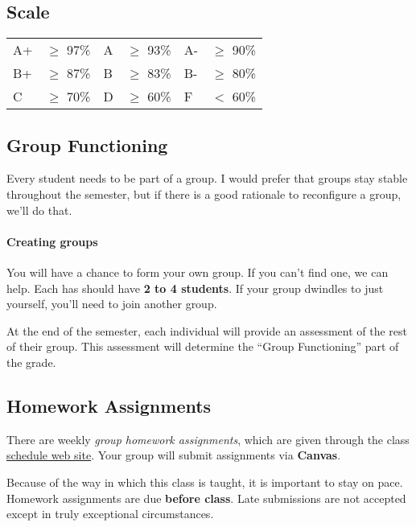 \documentclass[11pt]{article}
\begin{document}
\subsection{Scale}\label{scale}

\begin{tabular}{llllll}
A+ & $\ge$ 97\% & A & $\ge$  93\% & A- & $\ge$
90\% \\
B+ & $\ge$  87\% & B & $\ge$  83\% & B- & $\ge$
80\% \\
C & $\ge$  70\% & D & $\ge$  60\% & F & $<$
60\% \\
\end{tabular}

\subsection{Group Functioning}\label{group-functioning}

Every student needs to be part of a group. I would prefer that groups
stay stable throughout the semester, but if there is a good rationale to
reconfigure a group, we'll do that.



\paragraph{Creating groups} You will have a chance to form your own group.
If you can't find one, we can help. Each has should have \textbf{2 to 4 students}. If your group dwindles to just yourself, you'll need to join another group.

At the end of the semester, each individual will provide an assessment
of the rest of their group. This assessment will determine the ``Group Functioning'' part of the grade.

\subsection{Homework Assignments}\label{homework-assignments}

There are weekly \emph{group homework assignments}, which are given through the class \href{https://nguyenthanhvuh.github.io/class-oo/assignments}{schedule web site}. Your group will submit assignments via \textbf{Canvas}.

Because of the way in which this class is taught, it is important to
stay on pace. Homework assignments are due \textbf{before class}. Late submissions
are not accepted except in truly exceptional circumstances.
\end{document}
